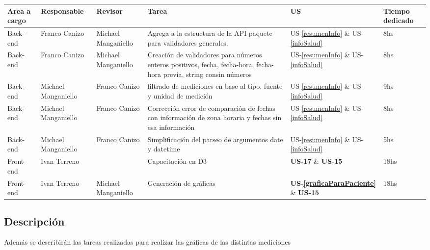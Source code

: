 \documentclass[a4paper,12pt]{article}
\begin{document}
	{\scriptsize
	\begin{center} %
	\centering
    \resizebox{\textwidth}{!}
    {
	\begin{tabular}{|l|l|l|p{5cm}|l|p{1cm}|}
		\hline
		\textbf{Area a cargo} &
		\textbf{Responsable} &        
		\textbf{Revisor} &        	        
		\textbf{Tarea} &
		\textbf{US} &
		\textbf{Tiempo dedicado} \\
   		\hline
       
	    Back-end& Franco Canizo& Michael Manganiello & Agrega a la estructura de la API paquete para validadores generales.  & US-\ref{resumenInfo} \& US-\ref{infoSalud}& 8hs\\ \hline
	    Back-end& Franco Canizo& Michael Manganiello & Creación de validadores para números enteros positivos, fecha, fecha-hora, fecha-hora previa, string con\/sin números  & US-\ref{resumenInfo} \& US-\ref{infoSalud} &8hs\\ \hline
	    Back-end& Michael Manganiello& Franco Canizo & filtrado de mediciones en base al tipo, fuente y unidad de medición & US-\ref{resumenInfo} \& US-\ref{infoSalud}&9hs \\ \hline
	    Back-end& Michael Manganiello& Franco Canizo & Corrección error de comparación de fechas con información de zona horaria y fechas sin esa información & US-\ref{resumenInfo} \& US-\ref{infoSalud} &8hs\\ \hline
	    Back-end& Michael Manganiello& Franco Canizo & Simplificación del parseo de argumentos date y datetime & US-\ref{resumenInfo} \& US-\ref{infoSalud} &5hs \\ \hline        
   	    Front-end& Ivan Terreno & & Capacitación en D3 & \textbf{US-17} \& \textbf{US-15}&18hs\\ \hline
   	    Front-end& Ivan Terreno& Michael Manganiello & Generación de gráficas & \textbf{US-\ref{graficaParaPaciente}} \& \textbf{US-15}&18hs\\ \hline        
	    \end{tabular}
        }
    	\end{center}
	}


\subsection{Descripción}

Además se describirán las tareas realizadas para realizar las gráficas de las distintas mediciones
\end{document}
